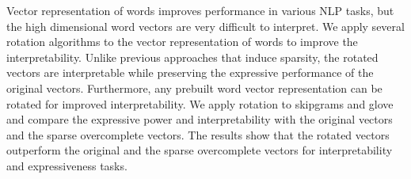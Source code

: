 Vector representation of words improves performance in various NLP tasks, but the high dimensional word vectors are very difficult to interpret. We apply several rotation algorithms to the vector representation of words to improve the interpretability. Unlike previous approaches that induce sparsity, the rotated vectors are interpretable while preserving the expressive performance of the original vectors. Furthermore, any prebuilt word vector representation can be rotated for improved interpretability. We apply rotation to skipgrams and glove and compare the expressive power and interpretability with the original vectors and the sparse overcomplete vectors. The results show that the rotated vectors outperform the original and the sparse overcomplete vectors for interpretability and expressiveness tasks.
